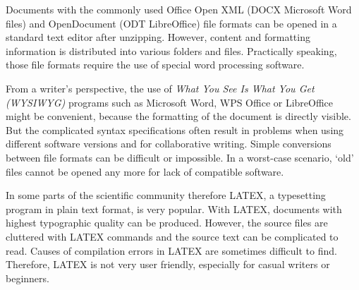 \documentclass[10pt,fleqn]{wlpeerj}
\begin{document}
Documents with the commonly used Office Open XML (DOCX Microsoft Word
files) and OpenDocument (ODT LibreOffice) file formats can be opened in
a standard text editor after unzipping. However, content and formatting
information is distributed into various folders and files. Practically
speaking, those file formats require the use of special word processing
software.

From a writer's perspective, the use of \emph{What You See Is What You
Get (WYSIWYG)} programs such as Microsoft Word, WPS Office or
LibreOffice might be convenient, because the formatting of the document
is directly visible. But the complicated syntax specifications often
result in problems when using different software versions and for
collaborative writing. Simple conversions between file formats can be
difficult or impossible. In a worst-case scenario, `old' files cannot be
opened any more for lack of compatible software.

In some parts of the scientific community therefore LATEX, a typesetting
program in plain text format, is very popular. With LATEX, documents
with highest typographic quality can be produced. However, the source
files are cluttered with LATEX commands and the source text can be
complicated to read. Causes of compilation errors in LATEX are sometimes
difficult to find. Therefore, LATEX is not very user friendly,
especially for casual writers or beginners.
\end{document}

